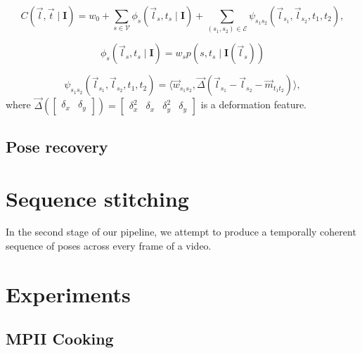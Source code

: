 \documentclass[runningheads]{llncs}
\newcommand{\mat}{\mathbf}
\begin{document}
\begin{equation}
\label{eqn:full-cost}
C(\vec l, \vec t \mid \mat I)
= w_0 + \sum_{s \in \mathcal V} \phi_s(\vec l_s, t_s \mid \mat I)
+ \sum_{(s_1, s_2) \in \mathcal E}
    \psi_{s_1 s_2}(\vec l_{s_1}, \vec l_{s_2}, t_1, t_2),
\end{equation}

\begin{equation}
\label{eqn:unary-cost}
\phi_s(\vec l_s, t_s \mid \mat I) = w_s p(s, t_s \mid \mat I(\vec l_s))
\end{equation}

\begin{equation}
\label{eqn:pair-cost}
\psi_{s_1 s_2}(\vec l_{s_1}, \vec l_{s_2}, t_1, t_2)
= \langle
    \vec w_{s_1 s_2},
    \vec \Delta(\vec l_{s_1} - \vec l_{s_2}  - \vec m_{t_1 t_2})
\rangle,
\end{equation}
where $\vec \Delta(\begin{bmatrix}\delta_x & \delta_y\end{bmatrix}) =
\begin{bmatrix}\delta_x^2 & \delta_x & \delta_y^2 & \delta_y\end{bmatrix}$ is a
deformation feature.

\subsection{Pose recovery}

\section{Sequence stitching}

%

In the second stage of our pipeline, we attempt to produce a temporally coherent
sequence of poses across every frame of a video. %

\section{Experiments}


\subsection{MPII Cooking}
\end{document}
